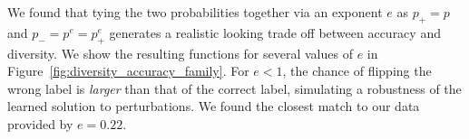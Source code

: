 \documentclass{article}
\begin{document}
We found that tying the two probabilities together via an exponent $e$ as $p_\mathrm{+}=p$ and $p_\mathrm{-}=p^e = p_\mathrm{+}^e$ generates a realistic looking trade off between accuracy and diversity. We show the resulting functions for several values of $e$ in Figure~\ref{fig:diversity_accuracy_family}. For $e<1$, the chance of flipping the wrong label is \textit{larger} than that of the correct label, simulating a robustness of the learned solution to perturbations. We found the closest match to our data provided by $e=0.22$.




%
%
%
%
%
%
%
%
%
%
%
%
%
%
%
%
%
%
%
%
%
%
%
%


%
%
%
%
%

%
%


%

%
%
%
%
%
%
%
%
%
%
%

%
%

%
%
%
%
%
%
%
%

%
%
%
%


%

%

%
%
%
%
%
%
%
%
%
%
%
%
%

%
%
%
%

%
%
%
%
%
%
%
%
%
%

%
%
%
%

%
%
%
%
%
%
%
 
%
%
%
%
%




%
%
%
%
%
%
%
%
%
%
%
%
%
%


%
%
%
%
%
%

%


%
%
%
%
%
%
%
%
%
%
%
%



%
%
%
%
%
%
%
%
%
%
%
%
%
%

%
%
%
%
%
%
\end{document}
